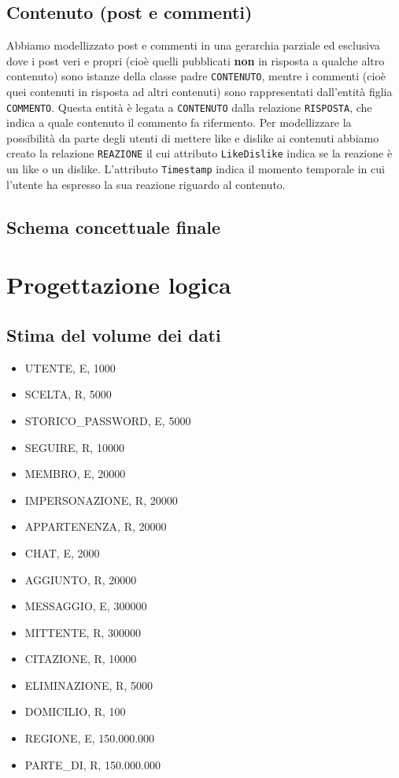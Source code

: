 \documentclass[a4paper,12pt]{report}
\begin{document}
\section{Contenuto (post e commenti)}
Abbiamo modellizzato post e commenti in una gerarchia parziale ed esclusiva dove i post veri e propri (cioè quelli pubblicati \textbf{non} in risposta a qualche altro contenuto) sono istanze della classe padre \texttt{CONTENUTO}, mentre i commenti (cioè quei contenuti in risposta ad altri contenuti) sono rappresentati dall'entità figlia \texttt{COMMENTO}. Questa entità è legata a \texttt{CONTENUTO} dalla relazione \texttt{RISPOSTA}, che indica a quale contenuto il commento fa rifermento.
Per modellizzare la possibilità da parte degli utenti di mettere like e dislike ai contenuti abbiamo creato la relazione \texttt{REAZIONE} il cui attributo \texttt{LikeDislike} indica se la reazione è un like o un dislike. L'attributo \texttt{Timestamp} indica il momento temporale in cui l'utente ha espresso la sua reazione riguardo al contenuto. 
\section{Schema concettuale finale}
\chapter{Progettazione logica}
\section{Stima del volume dei dati}

\begin{itemize}
  \item UTENTE, E, 1000
  \item SCELTA, R, 5000
  \item STORICO\_PASSWORD, E, 5000
  \item SEGUIRE, R, 10000
  \item MEMBRO, E, 20000
  \item IMPERSONAZIONE, R, 20000
  \item APPARTENENZA, R, 20000
  \item CHAT, E, 2000 
  \item AGGIUNTO, R, 20000 
  \item MESSAGGIO, E, 300000
  \item MITTENTE, R, 300000
  \item CITAZIONE, R, 10000
  \item ELIMINAZIONE, R, 5000
  \item DOMICILIO, R, 100
  \item REGIONE, E, 150.000.000
  \item PARTE\_DI, R, 150.000.000

\end{itemize}
\end{document}
